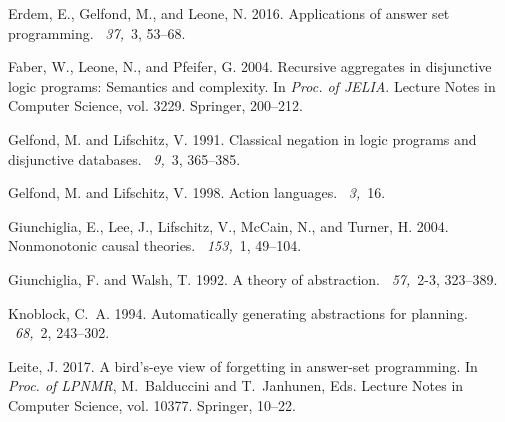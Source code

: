 \documentclass{new_tlp}
\begin{document}
\begin{thebibliography}{}
{\sc Erdem, E.}, {\sc Gelfond, M.}, {\sc and} {\sc Leone, N.} 2016.
\newblock Applications of answer set programming.
~{\em 37,\/}~3, 53--68.

{\sc Faber, W.}, {\sc Leone, N.}, {\sc and} {\sc Pfeifer, G.} 2004.
\newblock Recursive aggregates in disjunctive logic programs: Semantics and
  complexity.
\newblock In {\em Proc. of JELIA}. Lecture Notes in Computer Science, vol.
  3229. Springer, 200--212.

{\sc Gelfond, M.} {\sc and} {\sc Lifschitz, V.} 1991.
\newblock Classical negation in logic programs and disjunctive databases.
~{\em 9,\/}~3, 365--385.

{\sc Gelfond, M.} {\sc and} {\sc Lifschitz, V.} 1998.
\newblock Action languages.
~{\em 3,\/}~16.

{\sc Giunchiglia, E.}, {\sc Lee, J.}, {\sc Lifschitz, V.}, {\sc McCain, N.},
  {\sc and} {\sc Turner, H.} 2004.
\newblock Nonmonotonic causal theories.
~{\em 153,\/}~1, 49--104.

{\sc Giunchiglia, F.} {\sc and} {\sc Walsh, T.} 1992.
\newblock A theory of abstraction.
~{\em 57,\/}~2-3, 323--389.

{\sc Knoblock, C.~A.} 1994.
\newblock Automatically generating abstractions for planning.
~{\em 68,\/}~2, 243--302.

{\sc Leite, J.} 2017.
\newblock A bird's-eye view of forgetting in answer-set programming.
\newblock In {\em Proc. of LPNMR}, {M.~Balduccini} {and} {T.~Janhunen}, Eds.
  Lecture Notes in Computer Science, vol. 10377. Springer, 10--22.


\end{thebibliography}
\end{document}
